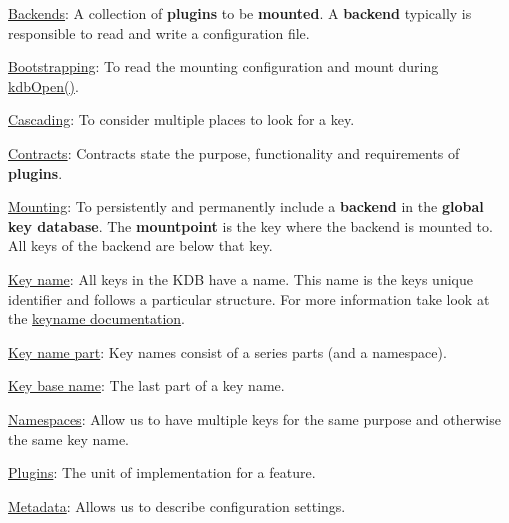 \begin{DoxyItemize}
\item \hyperlink{doc_help_elektra-backends_md}{Backends}\+: A collection of {\bfseries plugins} to be {\bfseries mounted}. A {\bfseries backend} typically is responsible to read and write a configuration file.
\item \hyperlink{doc_help_elektra-bootstrapping_md}{Bootstrapping}\+: To read the mounting configuration and mount during {\ttfamily \hyperlink{group__kdb_ga6808defe5870f328dd17910aacbdc6ca}{kdb\+Open()}}.
\item \hyperlink{doc_help_elektra-cascading_md}{Cascading}\+: To consider multiple places to look for a key.
\item \hyperlink{doc_help_elektra-contracts_md}{Contracts}\+: Contracts state the purpose, functionality and requirements of {\bfseries plugins}.
\item \hyperlink{doc_help_elektra-mounting_md}{Mounting}\+: To persistently and permanently include a {\bfseries backend} in the {\bfseries global key database}. The {\bfseries mountpoint} is the key where the backend is mounted to. All keys of the backend are below that key.
\item \hyperlink{doc_KEYNAMES_md}{Key name}\+: All keys in the K\+DB have a name. This name is the keys unique identifier and follows a particular structure. For more information take look at the \hyperlink{doc_KEYNAMES_md}{keyname documentation}.
\item \hyperlink{doc_KEYNAMES_md}{Key name part}\+: Key names consist of a series parts (and a namespace).
\item \hyperlink{doc_KEYNAMES_md}{Key base name}\+: The last part of a key name.
\item \hyperlink{doc_help_elektra-namespaces_md}{Namespaces}\+: Allow us to have multiple keys for the same purpose and otherwise the same key name.
\item \hyperlink{src_plugins_README_md}{Plugins}\+: The unit of implementation for a feature.
\item \hyperlink{doc_help_elektra-metadata_md}{Metadata}\+: Allows us to describe configuration settings.
\end{DoxyItemize}


